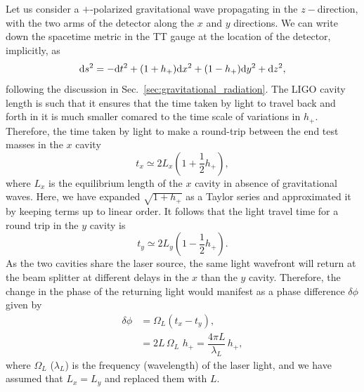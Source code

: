 Let us consider a $+$-polarized gravitational wave propagating in the 
$z-$direction, with the two arms of the detector along the $x$ and $y$ directions.
We can write down the spacetime metric in the TT gauge at the
location of the detector, implicitly, as
%
\begin{equation}
 \mathrm{d} s^2 = -\mathrm{d} t^2 + (1+h_+)\mathrm{d} x^2 + (1-h_+)\mathrm{d} y^2 + \mathrm{d} z^2,
\end{equation}
% 
following the discussion in Sec.~\ref{sec:gravitational_radiation}. The LIGO 
cavity length is such that it ensures that the time taken by light to travel 
back and forth in it is much smaller comared to the time scale of variations in
$h_+$. Therefore, the time taken by light to make a round-trip between the end
test masses in the $x$ cavity 
% 
\begin{equation}
 t_x \simeq 2L_x (1 + \frac{1}{2}h_+),
\end{equation}
% 
where $L_x$ is the equilibrium length of the $x$ cavity in absence of 
gravitational waves. Here, we have expanded $\sqrt{1+h_+}$ as a Taylor series
and approximated it by keeping terms up to linear order. 
It follows that the light travel time for a round trip in 
the $y$ cavity is
% 
\begin{equation}
 t_y \simeq 2L_y (1 - \frac{1}{2}h_+).
\end{equation}
% 
As the two cavities share the laser source, the same light wavefront will 
return at the beam splitter at different delays in the $x$ than the $y$ cavity. 
Therefore, the change in the phase of the returning light would manifest as a 
phase difference $\delta\phi$ given by
% 
\begin{align}
 \delta\phi &= \Omega_L (t_x - t_y), \\ \nonumber
 &= 2 L\, \Omega_L\,\, h_+ = \dfrac{4\pi L}{\lambda_L}\,h_+,
\end{align}
where $\Omega_L$ ($\lambda_L$) is the frequency (wavelength) of the laser 
light, and we have assumed that $L_x = L_y$ and replaced them with $L$. 


